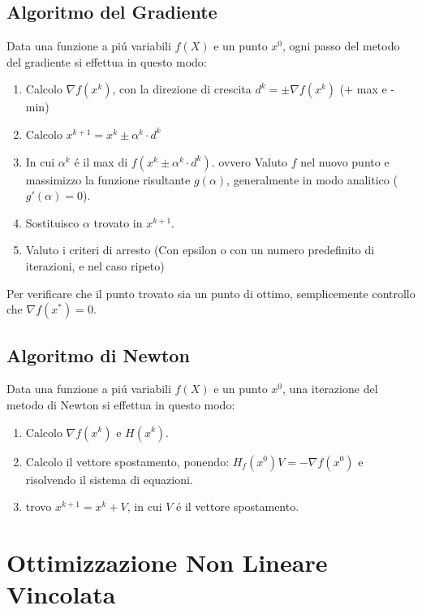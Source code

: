 \documentclass[12pt, a4paper, openany]{book}
\begin{document}
\section{Algoritmo del Gradiente}
Data una funzione a piú variabili $f(X)$ e un punto $x^0$, ogni passo del metodo del gradiente si effettua in questo modo:
\begin{enumerate}
	\item Calcolo $\nabla f(x^k)$, con la direzione di crescita $d^k=\pm \nabla f(x^k)$ ($+$ max e - min)
	\item Calcolo $x^{k+1} = x^k \pm \alpha^k \cdot d^k$
	\item In cui $\alpha^k$ é il max di $f(x^k \pm \alpha^k \cdot d^k)$. ovvero
	      Valuto $f$ nel nuovo punto e massimizzo la funzione risultante $g(\alpha)$, generalmente in modo analitico ($g'(\alpha)=0$).
	\item Sostituisco $\alpha$ trovato in $x^{k+1}$.
	\item Valuto i criteri di arresto (Con epsilon o con un numero predefinito di iterazioni, e nel caso ripeto)
\end{enumerate}
Per verificare che il punto trovato sia un punto di ottimo, semplicemente controllo che $\nabla f(x^*) = 0$.
\pagebreak

\section{Algoritmo di Newton}
Data una funzione a piú variabili $f(X)$ e un punto $x^0$, una iterazione del metodo di Newton si effettua in questo modo:
\begin{enumerate}
	\item Calcolo $\nabla f(x^k)$ e $H(x^k)$.
	\item Calcolo il vettore spostamento, ponendo: $H_f(x^0) V = - \nabla f(x^0)$ e risolvendo il sistema di equazioni.
	\item trovo $x^{k+1} = x^k + V$, in cui $V$ é il vettore spostamento.
\end{enumerate}


\chapter{Ottimizzazione Non Lineare Vincolata}
\end{document}
